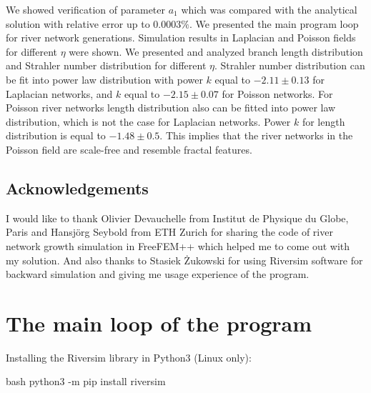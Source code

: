 \documentclass[]{pracamgr}
\begin{document}
    We showed verification of parameter $a_1$ which was compared with the analytical solution with relative error up to $0.0003\%$. We presented the main program loop for river network generations. Simulation results in Laplacian and Poisson fields for different $\eta$ were shown. We presented and analyzed branch length distribution and Strahler number distribution for different $\eta$. Strahler number distribution can be fit into power law distribution with power $k$ equal to $-2.11 \pm 0.13$ for Laplacian networks, and $k$ equal to $-2.15 \pm 0.07$ for Poisson networks. For Poisson river networks length distribution also can be fitted into power law distribution, which is not the case for Laplacian networks. Power $k$ for length distribution is equal to $-1.48 \pm 0.5$. This implies that the river networks in the Poisson field are scale-free and resemble fractal features.\par

    \section*{Acknowledgements}
      
      I would like to thank Olivier Devauchelle from Institut de Physique du Globe, Paris and Hansjörg Seybold from ETH Zurich for sharing the code of river network growth simulation in FreeFEM++ which helped me to come out with my solution. And also thanks to Stasiek Żukowski for using Riversim software for backward simulation and giving me usage experience of the program.

    

  \appendix

  \chapter{The main loop of the program}
    
    Installing the Riversim library in Python3 (Linux only):
    
    \begin{mintedbox}{bash} 
      python3 -m pip install riversim\end{mintedbox}
    
\end{document}
